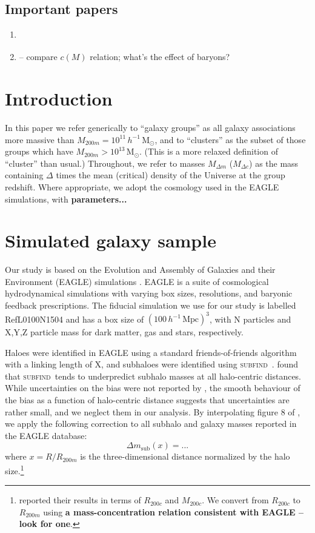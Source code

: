 \documentclass[usenatbib,fleqn]{mnras}
\newcommand{\Msun}{\mathrm{M}_\odot}
\newcommand{\hMsun}{h^{-1}\,\Msun}
\newcommand{\hMpc}{h^{-1}\,\mathrm{Mpc}}
\newcommand{\subfind}{\textsc{subfind}}
\begin{document}
\subsection{Important papers}

\begin{enumerate}
  \item \cite{vdbosch17}
  \item \cite{moline17} -- compare $c(M)$ relation; what's the effect of baryons?
\end{enumerate}

\section{Introduction}

In this paper we refer generically to ``galaxy groups'' as all galaxy associations more massive than $M_{200m}=10^{11}\,\hMsun$, and to ``clusters'' as the subset of those groups which have $M_{200m}>10^{13}\,\Msun$. (This is a more relaxed definition of ``cluster'' than usual.) Throughout, we refer to masses $M_{\Delta m}$ ($M_{\Delta c}$) as the mass containing $\Delta$ times the mean (critical) density of the Universe at the group redshift. Where appropriate, we adopt the cosmology used in the EAGLE simulations,  with \textbf{parameters...}


\section{Simulated galaxy sample}

Our study is based on the Evolution and Assembly of Galaxies and their Environment (EAGLE) simulations \citep{schaye15,crain15}. EAGLE is a suite of cosmological hydrodynamical simulations with varying box sizes, resolutions, and baryonic feedback prescriptions. The fiducial simulation we use for our study is labelled RefL0100N1504 and has a box size of $(100\,\hMpc)^3$, with N particles and X,Y,Z particle mass for dark matter, gas and stars, respectively.

Haloes were identified in EAGLE using a standard friends-of-friends algorithm with a linking length of X, and subhaloes were identified using \subfind\ \citep{springel01_cluster}. \cite{knebe11} found that \subfind\ tends to underpredict subhalo masses at all halo-centric distances. While uncertainties on the bias were not reported by \cite{knebe11}, the smooth behaviour of the bias as a function of halo-centric distance suggests that uncertainties are rather small, and we neglect them in our analysis. By interpolating figure 8 of \cite{knebe11}, we apply the following correction to all subhalo and galaxy masses reported in the EAGLE database:
\begin{equation}\label{eq:subfind_correction}
  \Delta m_\mathrm{sub}(x) = ...
\end{equation}
where $x=R/R_{200m}$ is the three-dimensional distance normalized by the halo size.\footnote{\cite{knebe11} reported their results in terms of $R_{200c}$ and $M_{200c}$. We convert from $R_{200c}$ to $R_{200m}$ using \textbf{a mass-concentration relation consistent with EAGLE -- look for one}.}
\end{document}
